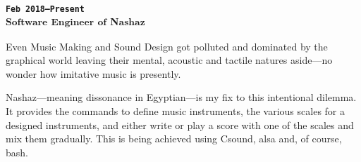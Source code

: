 \subsubsection{\textsubscript{\uppercase{\texttt{Feb 2018--Present}}\\
Software Engineer of Nashaz
}
}
Even Music Making and Sound Design got polluted and dominated by the graphical 
world leaving their mental, acoustic and tactile natures aside---no wonder how 
imitative music is presently.

Nashaz---meaning dissonance in Egyptian---is my fix to this intentional dilemma.
It provides the commands to define music instruments, the various scales for a 
designed instruments, and either write or play a score with one of the scales 
and mix them gradually.
This is being achieved using Csound, alsa and, of course, bash.
